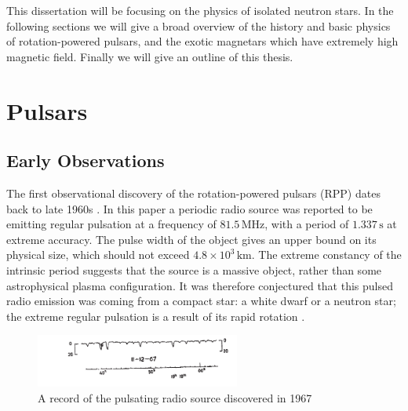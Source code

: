 This dissertation will be focusing on the physics of isolated neutron stars. In
the following sections we will give a broad overview of the history and basic
physics of rotation-powered pulsars, and the exotic magnetars which have
extremely high magnetic field. Finally we will give an outline of this thesis.

\section{Pulsars}
\label{sec:intro-pulsars}

\subsection{Early Observations}

The first observational discovery of the rotation-powered pulsars (RPP) dates
back to late 1960s \citep{hewish_observation_1968}. In this paper a periodic
radio source was reported to be emitting regular pulsation at a frequency of
$81.5\,\mathrm{MHz}$, with a period of $1.337\,\mathrm{s}$ at extreme accuracy.
The pulse width of the object gives an upper bound on its physical size, which
should not exceed $4.8\times 10^3\,\mathrm{km}$. The extreme constancy of the
intrinsic period suggests that the source is a massive object, rather than some
astrophysical plasma configuration. It was therefore conjectured that this
pulsed radio emission was coming from a compact star: a white dwarf or a neutron
star; the extreme regular pulsation is a result of its rapid rotation
\citep{gold_rotating_1968}.

\begin{figure}[h]
  \centering
  \includegraphics[width=0.6\textwidth]{pics/intro/pulses.png}
  \caption[A record of pulsating radio source]{A record of the pulsating radio
    source discovered in 1967 \citep{hewish_observation_1968}}
  \label{fig:pulse}
\end{figure}

